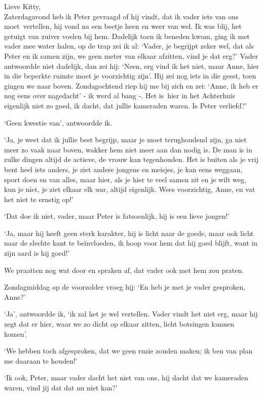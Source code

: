 \documentclass{book}
\begin{document}
Lieve Kitty,\\
Zaterdagavond heb ik Peter gevraagd of hij vindt, dat ik vader
iets van ons moet~vertellen, hij vond na een beetje heen en weer van wel. Ik was
blij, het getuigt van zuiver voelen bij hem. Dadelijk toen ik beneden kwam, ging
ik met vader mee water halen, op de trap zei ik al: `Vader, je begrijpt zeker
wel, dat als Peter en ik samen zijn, we geen meter van elkaar afzitten, vind je
dat erg?' Vader antwoordde niet dadelijk, dan zei hij: `Neen, erg vind ik het
niet, maar Anne, hier in die beperkte ruimte moet je voorzichtig zijn'. Hij zei
nog iets in die geest, toen gingen we naar boven. Zondagochtend riep hij me bij
zich en zei: `Anne, ik heb er nog eens over nagedacht' - ik werd al bang -. Het
is~hier in het Achterhuis eigenlijk niet zo goed, ik dacht, dat jullie kameraden
waren. Is Peter verliefd?'

`Geen kwestie van', antwoordde ik.

`Ja, je weet dat ik jullie best begrijp, maar je moet terughoudend zijn, ga niet
meer zo vaak naar boven, wakker hem niet meer aan dan nodig is.  De man is in
zulke dingen altijd de actieve, de vrouw kan tegenhouden.  Het is buiten als je
vrij bent heel iets anders, je ziet andere jongens en meisjes, je kan eens
weggaan, sport doen en van alles, maar hier, als je hier te veel samen zit en je
wilt weg, kun je niet, je ziet elkaar elk uur, altijd eigenlijk. Wees
voorzichtig, Anne, en vat het niet te ernstig op!'

`Dat doe ik niet, vader, maar Peter is fatsoenlijk, hij is een lieve jongen!'

`Ja, maar hij heeft geen sterk karakter, hij is licht naar de goede, maar ook
licht naar de slechte kant te beïnvloeden, ik hoop voor hem dat hij goed blijft,
want in zijn aard is hij goed!'

We praatten nog wat door en spraken af, dat vader ook met hem zou praten.

Zondagmiddag op de voorzolder vroeg hij: `En heb je met je vader gesproken,
Anne?'

`Ja', antwoordde ik, `ik zal het je wel vertellen. Vader vindt het niet erg,
maar hij zegt dat er hier, waar we zo dicht op elkaar zitten, licht botsingen
kunnen komen'.

`We hebben toch afgesproken, dat we geen ruzie zouden maken; ik ben van plan me
daaraan te houden!'

`Ik ook, Peter, maar vader dacht het niet van ons, hij dacht dat we kameraden
waren, vind jij dat dat nu niet kan?'
\end{document}
